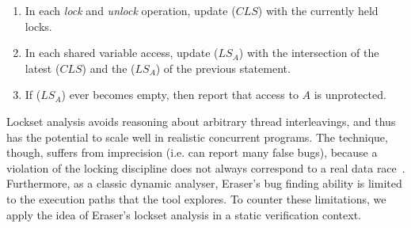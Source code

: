\begin{enumerate}
\item In each \emph{lock} and \emph{unlock} operation, update ($CLS$) with the currently held locks.
\item In each shared variable access, update ($LS_A$) with the intersection of the latest ($CLS$) and the ($LS_A$) of the previous statement.
\item If ($LS_A$) ever becomes empty, then report that access to $A$ is unprotected.
\end{enumerate}

Lockset analysis avoids reasoning about arbitrary thread interleavings, and thus has the potential to scale well in realistic concurrent programs. The technique, though, suffers from imprecision (i.e. can report many false bugs), because a violation of the locking discipline does not always correspond to a real data race~\cite{savage1997eraser, pozniansky2003efficient, o2003hybrid, elmas2007goldilocks, flanagan2009fasttrack}. Furthermore, as a classic dynamic analyser, Eraser's bug finding ability is limited to the execution paths that the tool explores. To counter these limitations, we apply the idea of Eraser's lockset analysis in a static verification context.
